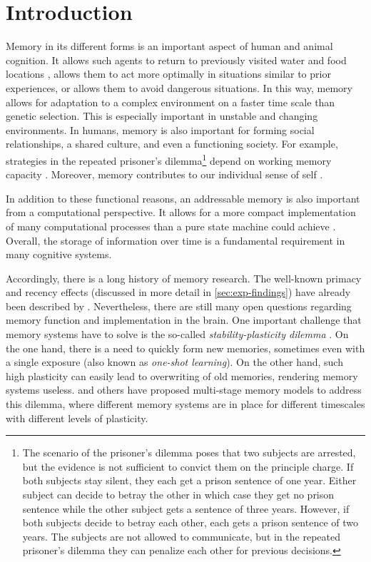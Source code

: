 \chapter{Introduction}

Memory in its different forms is an important aspect of human and animal cognition.
It allows such agents to return to previously visited water and food locations \parencite{vorhees2014}, allows them to act more optimally in situations similar to prior experiences, or allows them to avoid dangerous situations.
In this way, memory allows for adaptation to a complex environment on a faster time scale than genetic selection.
This is especially important in unstable and changing environments.
In humans, memory is also important for forming social relationships, a shared culture, and even a functioning society.
For example, strategies in the repeated prisoner's
dilemma\footnote{The scenario of the prisoner's dilemma poses that two subjects are arrested, but the evidence is not sufficient to convict them on the principle charge. If both subjects stay silent, they each get a prison sentence of one year. Either subject can decide to betray the other in which case they get no prison sentence while the other subject gets a sentence of three years. However, if both subjects decide to betray each other, each gets a prison sentence of two years. The subjects are not allowed to communicate, but in the repeated prisoner's dilemma they can penalize each other for previous decisions.} depend on working memory capacity \parencite{milinski1998}.
Moreover, memory contributes to our individual sense of self \parencite{prebble2013}.

In addition to these functional reasons, an addressable memory is also important from a computational perspective.
It allows for a more compact implementation of many computational processes than a pure state machine could achieve \parencite{gallistel2009}.
Overall, the storage of information over time is a fundamental requirement in many cognitive systems.

Accordingly, there is a long history of memory research.
The well-known primacy and recency effects (discussed in more detail in \cref{sec:exp-findings}) have already been described by \textcite{Robinson1926}.
Nevertheless, there are still many open questions regarding memory function and implementation in the brain.
One important challenge that memory systems have to solve is the so-called \emph{stability-plasticity dilemma} \parencite{Abraham2005}.
On the one hand, there is a need to quickly form new memories, sometimes even with a single exposure (also known as \emph{one-shot learning}).
On the other hand, such high plasticity can easily lead to overwriting of old memories, rendering memory systems useless.
\Textcite{Buzsaki1989} and others have proposed multi-stage memory models to address this dilemma, where different memory systems are in place for different timescales with different levels of plasticity.


